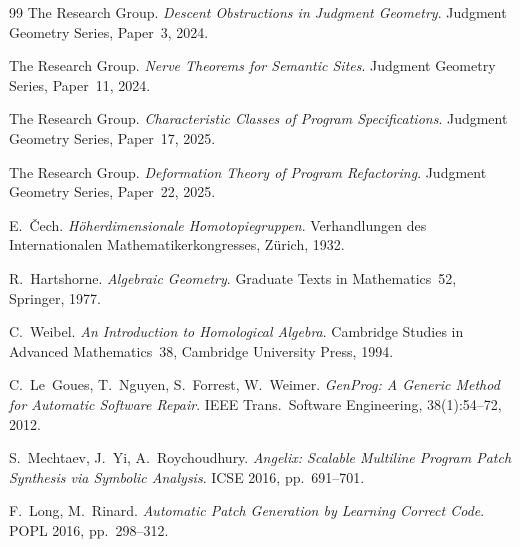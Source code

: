 \documentclass[11pt]{article}
\begin{document}
\begin{thebibliography}{99}
  The \JuGeo{} Research Group.
  \textit{Descent Obstructions in Judgment Geometry}.
  Judgment Geometry Series, Paper~3, 2024.

  The \JuGeo{} Research Group.
  \textit{Nerve Theorems for Semantic Sites}.
  Judgment Geometry Series, Paper~11, 2024.

  The \JuGeo{} Research Group.
  \textit{Characteristic Classes of Program Specifications}.
  Judgment Geometry Series, Paper~17, 2025.

  The \JuGeo{} Research Group.
  \textit{Deformation Theory of Program Refactoring}.
  Judgment Geometry Series, Paper~22, 2025.

  E.~\v{C}ech.
  \textit{H\"{o}herdimensionale Homotopiegruppen}.
  Verhandlungen des Internationalen Mathematikerkongresses,
  Zürich, 1932.

  R.~Hartshorne.
  \textit{Algebraic Geometry}.
  Graduate Texts in Mathematics~52, Springer, 1977.

  C.~Weibel.
  \textit{An Introduction to Homological Algebra}.
  Cambridge Studies in Advanced Mathematics~38, Cambridge University Press,
  1994.

  C.~Le~Goues, T.~Nguyen, S.~Forrest, W.~Weimer.
  \textit{GenProg: A Generic Method for Automatic Software Repair}.
  IEEE Trans.\ Software Engineering, 38(1):54--72, 2012.

  S.~Mechtaev, J.~Yi, A.~Roychoudhury.
  \textit{Angelix: Scalable Multiline Program Patch Synthesis via
  Symbolic Analysis}.
  ICSE 2016, pp.~691--701.

  F.~Long, M.~Rinard.
  \textit{Automatic Patch Generation by Learning Correct Code}.
  POPL 2016, pp.~298--312.
\end{thebibliography}
\end{document}
